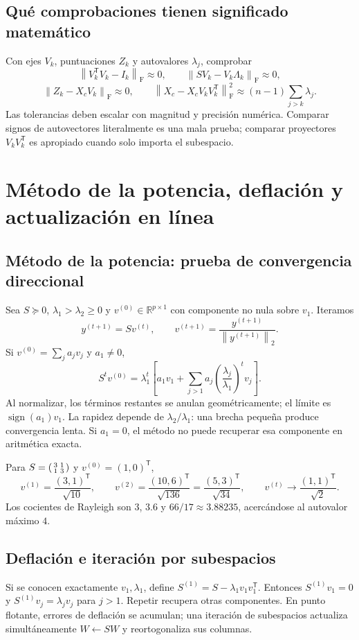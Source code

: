 \documentclass[11pt,a4paper]{article}
\newcommand{\R}{\mathbb R}
\newcommand{\T}{^{\mathsf T}}
\newcommand{\norm}[1]{\left\lVert #1\right\rVert}
\newcommand{\F}{_{\mathrm F}}
\theoremstyle{definition}
\begin{document}
\subsection{Qué comprobaciones tienen significado matemático}
Con ejes $V_k$, puntuaciones $Z_k$ y autovalores $\lambda_j$, comprobar
\[
\norm{V_k\T V_k-I_k}\F\approx0,\qquad
\norm{SV_k-V_k\Lambda_k}\F\approx0,
\]
\[
\norm{Z_k-X_cV_k}\F\approx0,\qquad
\norm{X_c-X_cV_kV_k\T}\F^2\approx(n-1)\sum_{j>k}\lambda_j.
\]
Las tolerancias deben escalar con magnitud y precisión numérica. Comparar signos de autovectores literalmente es una mala prueba; comparar proyectores $V_kV_k\T$ es apropiado cuando solo importa el subespacio.

\section{Método de la potencia, deflación y actualización en línea}
\subsection{Método de la potencia: prueba de convergencia direccional}
Sea $S\succeq0$, $\lambda_1>\lambda_2\ge0$ y $v^{(0)}\in\R^{p\times1}$ con componente no nula sobre $v_1$. Iteramos
\[
y^{(t+1)}=Sv^{(t)},\qquad v^{(t+1)}=\frac{y^{(t+1)}}{\norm{y^{(t+1)}}_2}.
\]
Si $v^{(0)}=\sum_j a_jv_j$ y $a_1\ne0$,
\[
S^tv^{(0)}=\lambda_1^t\left[a_1v_1+\sum_{j>1}a_j\left(\frac{\lambda_j}{\lambda_1}\right)^tv_j\right].
\]
Al normalizar, los términos restantes se anulan geométricamente; el límite es $\operatorname{sign}(a_1)v_1$. La rapidez depende de $\lambda_2/\lambda_1$: una brecha pequeña produce convergencia lenta. Si $a_1=0$, el método no puede recuperar esa componente en aritmética exacta.
\begin{ejemplo}
Para $S=\begin{psmallmatrix}3&1\\1&3\end{psmallmatrix}$ y $v^{(0)}=(1,0)\T$,
\[
v^{(1)}=\frac{(3,1)\T}{\sqrt{10}},\qquad
v^{(2)}=\frac{(10,6)\T}{\sqrt{136}}=\frac{(5,3)\T}{\sqrt{34}},\qquad
v^{(t)}\longrightarrow\frac{(1,1)\T}{\sqrt2}.
\]
Los cocientes de Rayleigh son $3$, $3.6$ y $66/17\approx3.88235$, acercándose al autovalor máximo $4$.
\end{ejemplo}
\subsection{Deflación e iteración por subespacios}
Si se conocen exactamente $v_1,\lambda_1$, define $S^{(1)}=S-\lambda_1v_1v_1\T$. Entonces $S^{(1)}v_1=0$ y $S^{(1)}v_j=\lambda_jv_j$ para $j>1$. Repetir recupera otras componentes. En punto flotante, errores de deflación se acumulan; una iteración de subespacios actualiza simultáneamente $W\leftarrow SW$ y reortogonaliza sus columnas.
\end{document}
